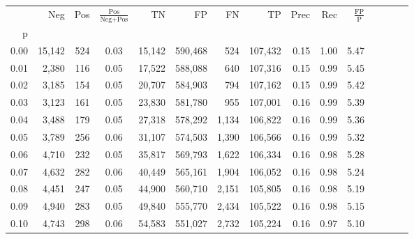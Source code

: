 \begin{tabular}{rrrcrrrrrrrrrrr}
\toprule
{} &     Neg &    Pos & $\frac{\text{Pos}}{\text{Neg}+\text{Pos}}$ &       TN &       FP &       FN &       TP &  Prec &   Rec & $\frac{\text{FP}}{\text{P}}$ \\
p    &         &        &                                            &          &          &          &          &       &       &                              \\
\midrule
0.00 &  15,142 &    524 &                                       0.03 &   15,142 &  590,468 &      524 &  107,432 &  0.15 &  1.00 &                         5.47 \\
0.01 &   2,380 &    116 &                                       0.05 &   17,522 &  588,088 &      640 &  107,316 &  0.15 &  0.99 &                         5.45 \\
0.02 &   3,185 &    154 &                                       0.05 &   20,707 &  584,903 &      794 &  107,162 &  0.15 &  0.99 &                         5.42 \\
0.03 &   3,123 &    161 &                                       0.05 &   23,830 &  581,780 &      955 &  107,001 &  0.16 &  0.99 &                         5.39 \\
0.04 &   3,488 &    179 &                                       0.05 &   27,318 &  578,292 &    1,134 &  106,822 &  0.16 &  0.99 &                         5.36 \\
0.05 &   3,789 &    256 &                                       0.06 &   31,107 &  574,503 &    1,390 &  106,566 &  0.16 &  0.99 &                         5.32 \\
0.06 &   4,710 &    232 &                                       0.05 &   35,817 &  569,793 &    1,622 &  106,334 &  0.16 &  0.98 &                         5.28 \\
0.07 &   4,632 &    282 &                                       0.06 &   40,449 &  565,161 &    1,904 &  106,052 &  0.16 &  0.98 &                         5.24 \\
0.08 &   4,451 &    247 &                                       0.05 &   44,900 &  560,710 &    2,151 &  105,805 &  0.16 &  0.98 &                         5.19 \\
0.09 &   4,940 &    283 &                                       0.05 &   49,840 &  555,770 &    2,434 &  105,522 &  0.16 &  0.98 &                         5.15 \\
0.10 &   4,743 &    298 &                                       0.06 &   54,583 &  551,027 &    2,732 &  105,224 &  0.16 &  0.97 &                         5.10 \\

\end{tabular}

